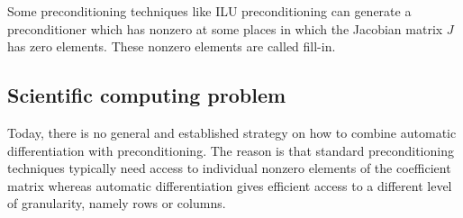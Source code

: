 \documentclass[12pt, twoside,a4paper,toc=bibliography]{scrbook}
\begin{document}
Some preconditioning techniques like ILU preconditioning can generate a preconditioner
which has nonzero at some places in which the Jacobian matrix $J$ has zero elements.
These nonzero elements are called fill-in.

\subsection{Scientific computing problem}
\label{ss.problem.precond}
Today, there is no general and established
strategy on how to combine automatic differentiation with preconditioning. The reason is
that standard preconditioning techniques typically need access to individual nonzero
elements of the coefficient matrix whereas automatic differentiation gives efficient
access to a different level of granularity, namely rows or columns.
\end{document}

